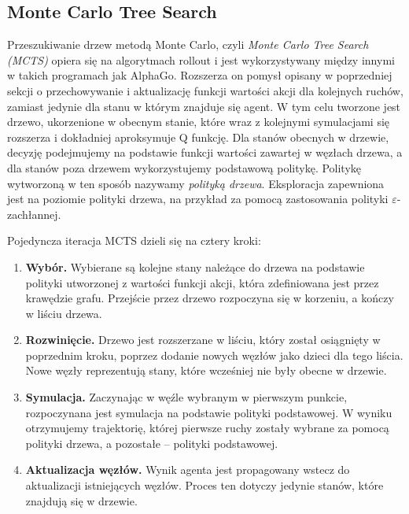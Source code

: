 \documentclass[licencjacka]{pracamgr}
\begin{document}
\subsection{Monte Carlo Tree Search}

Przeszukiwanie drzew metodą Monte Carlo, czyli \emph{Monte Carlo Tree Search (MCTS)} \cite{MCTS} opiera się na algorytmach rollout i jest wykorzystywany między innymi w takich programach jak AlphaGo\cite{alphago2016, alphagozero}. 
Rozszerza on pomysł opisany w poprzedniej sekcji o przechowywanie i aktualizację funkcji wartości akcji dla kolejnych ruchów, zamiast jedynie dla stanu w którym znajduje się agent. W tym celu tworzone jest drzewo, ukorzenione w obecnym stanie, które wraz z kolejnymi symulacjami się rozszerza i dokładniej aproksymuje Q funkcję. Dla stanów obecnych w drzewie, decyzję podejmujemy na podstawie funkcji wartości zawartej w węzłach drzewa, a dla stanów poza drzewem wykorzystujemy podstawową politykę. Politykę wytworzoną w ten sposób nazywamy \emph{polityką drzewa}. Eksploracja zapewniona jest na poziomie polityki drzewa, na przykład za pomocą zastosowania polityki $\varepsilon$-zachłannej.

Pojedyncza iteracja MCTS dzieli się na cztery kroki:

\begin{enumerate}
\item \textbf{Wybór.} Wybierane są kolejne stany należące do drzewa na podstawie polityki utworzonej z wartości funkcji akcji, która zdefiniowana jest przez krawędzie grafu. Przejście przez drzewo rozpoczyna się w korzeniu, a kończy w liściu drzewa.
\item \textbf{Rozwinięcie.} Drzewo jest rozszerzane w liściu, który został osiągnięty w poprzednim kroku, poprzez dodanie nowych węzłów jako dzieci dla tego liścia. Nowe węzły reprezentują stany, które wcześniej nie były obecne w drzewie.
\item \textbf{Symulacja.} Zaczynając w węźle wybranym w pierwszym punkcie, rozpoczynana jest symulacja na podstawie polityki podstawowej. W wyniku otrzymujemy trajektorię, której pierwsze ruchy zostały wybrane za pomocą polityki drzewa, a pozostałe -- polityki podstawowej.
\item \textbf{Aktualizacja węzłów.} Wynik agenta jest propagowany wstecz do aktualizacji istniejących węzłów. Proces ten dotyczy jedynie stanów, które znajdują się w drzewie.
\end{enumerate}
\end{document}
